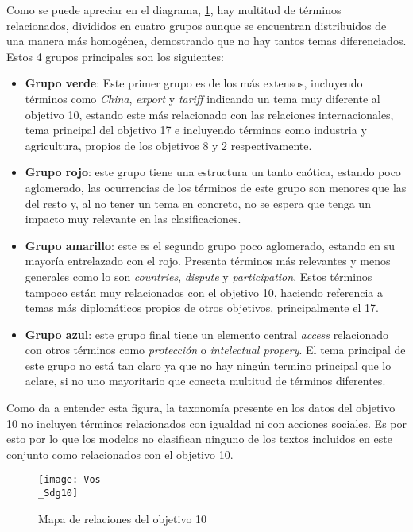 Como se puede apreciar en el diagrama, \cref{Mapa de relaciones del objetivo 10}, hay
multitud de términos relacionados, divididos en cuatro grupos aunque se
encuentran distribuidos de una manera más homogénea,  demostrando que no hay
tantos temas diferenciados. Estos 4 grupos principales son los siguientes:
\begin{itemize}
    \item \textbf{Grupo verde}: Este primer grupo es de los más extensos,
    incluyendo términos como \textit{China}, \textit{export} y \textit{tariff}
    indicando un tema muy diferente al objetivo 10, estando este más relacionado
    con las relaciones internacionales, tema principal del objetivo 17 e
    incluyendo términos como industria y agricultura, propios de los objetivos 8
    y 2 respectivamente.
    \item \textbf{Grupo rojo}: este grupo tiene una estructura un tanto caótica,
    estando poco aglomerado, las ocurrencias de los términos de este grupo son
    menores que las del resto y, al no tener un tema en concreto, no se espera
    que tenga un impacto muy relevante en las clasificaciones.
    \item \textbf{Grupo amarillo}: este es el segundo grupo poco aglomerado,
    estando en su mayoría entrelazado con el rojo. Presenta términos más
    relevantes y menos generales como lo son \textit{countries},
    \textit{dispute} y \textit{participation}. Estos términos tampoco están muy
    relacionados con el objetivo 10, haciendo referencia a temas más
    diplomáticos propios de otros objetivos, principalmente el 17. 
    \item \textbf{Grupo azul}: este grupo final tiene un elemento central
    \textit{access} relacionado con otros términos como \textit{protección} o
    \textit{intelectual propery}. El tema principal de este grupo no está tan
    claro ya que no hay ningún termino principal que lo aclare, si no uno
    mayoritario que conecta multitud de términos diferentes.
\end{itemize}

Como da a entender esta figura, la taxonomía presente en los datos del objetivo
10 no incluyen términos relacionados con igualdad ni con acciones sociales. Es
por esto por lo que los modelos no clasifican ninguno de los textos incluidos
en este conjunto como relacionados con el objetivo 10.



\begin{figure}[H]
    \centering
    \texttt{[image: Vos\\\_Sdg10]}
    \captionsetup{justification=centering}
    \caption{Mapa de relaciones del objetivo 10}
    \label{Mapa de relaciones del objetivo 10}
\end{figure}

